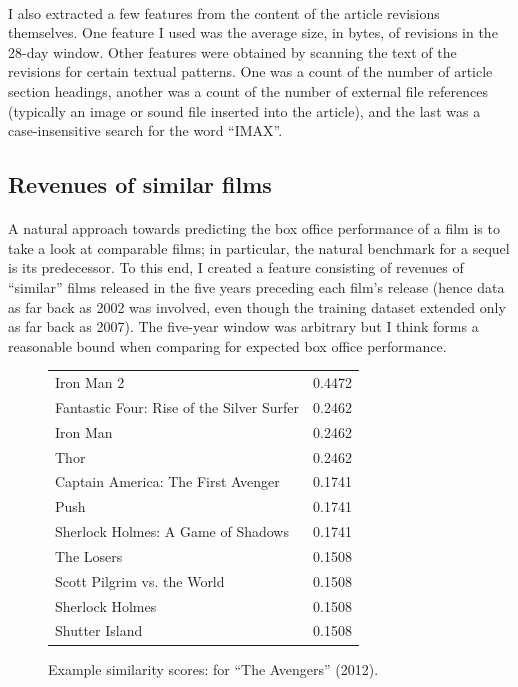 \documentclass[10pt]{article}
\begin{document}
    \paragraph{}
    I also extracted a few features from the content of the article revisions themselves. One feature I used was the average size, in bytes, of revisions in the 28-day window. Other features were obtained by scanning the text of the revisions for certain textual patterns. One was a count of the number of article section headings, another was a count of the number of external file references (typically an image or sound file inserted into the article), and the last was a case-insensitive search for the word ``IMAX''. 
    
    \subsection{Revenues of similar films}
    
    \paragraph{}
    A natural approach towards predicting the box office performance of a film is to take a look at comparable films; in particular, the natural benchmark for a sequel is its predecessor. To this end, I created a feature consisting of revenues of ``similar'' films released in the five years preceding each film's release (hence data as far back as 2002 was involved, even though the training dataset extended only as far back as 2007). The five-year window was arbitrary but I think forms a reasonable bound when comparing for expected box office performance. 
    
    \begin{figure}
        \centering
        \footnotesize
        \begin{tabular}{|l|r|}
            Iron Man 2 & 0.4472 \\
            Fantastic Four: Rise of the Silver Surfer & 0.2462 \\
            Iron Man & 0.2462 \\
            Thor & 0.2462 \\
            Captain America: The First Avenger & 0.1741 \\
            Push & 0.1741 \\
            Sherlock Holmes: A Game of Shadows & 0.1741 \\
            The Losers & 0.1508 \\
            Scott Pilgrim vs. the World & 0.1508 \\
            Sherlock Holmes & 0.1508 \\
            Shutter Island & 0.1508
        \end{tabular}
        \caption{Example similarity scores: for ``The Avengers'' (2012). }
        \label{fig:avengers-sim}
    \end{figure}
    
\end{document}
